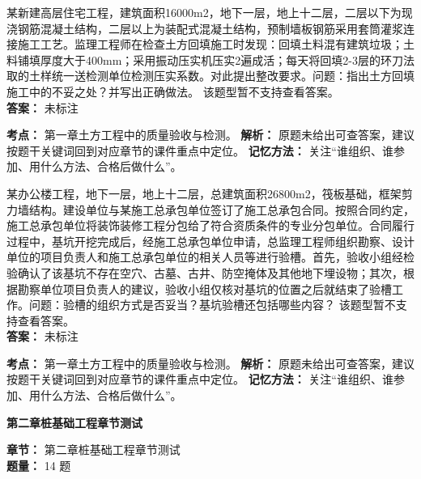 \documentclass[UTF8,fontset=fandol,11pt]{ctexart}
\newcommand{\chaptertitle}[1]{\vspace{0.5em}\begin{tcolorbox}[enhanced,colback=deepblue,colframe=deepblue,arc=2mm,boxrule=0pt]\begin{center}\Large\bfseries\color{white}#1\end{center}\end{tcolorbox}\vspace{0.5em}}
\begin{document}
\begin{quizbox}[title={第 34 题}]
某新建高层住宅工程，建筑面积16000m2，地下一层，地上十二层，二层以下为现浇钢筋混凝土结构，二层以上为装配式混凝土结构，预制墙板钢筋采用套筒灌浆连接施工工艺。监理工程师在检查土方回填施工时发现：回填土料混有建筑垃圾；土料铺填厚度大于400mm；采用振动压实机压实2遍成活；每天将回填2-3层的环刀法取的土样统一送检测单位检测压实系数。对此提出整改要求。问题：指出土方回填施工中的不妥之处？并写出正确做法。 该题型暂不支持查看答案。\\
\textbf{答案：} 未标注
\vspace{0.25em}
\begin{answerbox}[title={考点解析}]
\textbf{考点：} 第一章土方工程中的质量验收与检测。
\textbf{解析：} 原题未给出可查答案，建议按题干关键词回到对应章节的课件重点中定位。
\textbf{记忆方法：} 关注“谁组织、谁参加、用什么方法、合格后做什么”。
\end{answerbox}
\end{quizbox}

\begin{quizbox}[title={第 35 题}]
某办公楼工程，地下一层，地上十二层，总建筑面积26800m2，筏板基础，框架剪力墙结构。建设单位与某施工总承包单位签订了施工总承包合同。按照合同约定，施工总承包单位将装饰装修工程分包给了符合资质条件的专业分包单位。合同履行过程中，基坑开挖完成后，经施工总承包单位申请，总监理工程师组织勘察、设计单位的项目负责人和施工总承包单位的相关人员等进行验槽。首先，验收小组经检验确认了该基坑不存在空穴、古墓、古井、防空掩体及其他地下埋设物；其次，根据勘察单位项目负责人的建议，验收小组仅核对基坑的位置之后就结束了验槽工作。问题：验槽的组织方式是否妥当？基坑验槽还包括哪些内容？ 该题型暂不支持查看答案。\\
\textbf{答案：} 未标注
\vspace{0.25em}
\begin{answerbox}[title={考点解析}]
\textbf{考点：} 第一章土方工程中的质量验收与检测。
\textbf{解析：} 原题未给出可查答案，建议按题干关键词回到对应章节的课件重点中定位。
\textbf{记忆方法：} 关注“谁组织、谁参加、用什么方法、合格后做什么”。
\end{answerbox}
\end{quizbox}

\chaptertitle{第二章桩基础工程章节测试}
\begin{mainbox}
\textbf{\textcolor{mainblue}{章节：}} 第二章桩基础工程章节测试\\
\textbf{\textcolor{answerred}{题量：}} 14 题
\end{mainbox}
\end{document}
